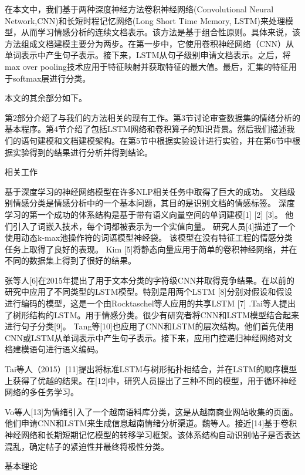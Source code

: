 \documentclass[a4paper,AutoFakeBold,oneside,12pt]{book}
\begin{document}
在本文中，我们基于两种深度神经方法卷积神经网络(Convolutional Neural Network,CNN)和长短时程记忆网络(Long Short Time Memory, LSTM)来处理模型，从而学习情感分析的连续文档表示。该方法是基于组合性原则。具体来说，该方法组成文档建模主要分为两步。在第一步中，它使用卷积神经网络（CNN）从单词表示中产生句子表示。接下来，LSTM从句子级别申请文档表示。之后，将max over pooling技术应用于特征映射并获取特征的最大值。最后，汇集的特征用于softmax层进行分类。

本文的其余部分如下。

第2部分介绍了与我们的方法相关的现有工作。第3节讨论审查数据集的情绪分析的基本程序。第4节介绍了包括LSTM网络和卷积算子的知识背景。然后我们描述我们的语句建模和文档建模架构。在第5节中根据实验设计进行实验，并在第6节中根据实验得到的结果进行分析并得到结论。

相关工作

基于深度学习的神经网络模型在许多NLP相关任务中取得了巨大的成功。 文档级别情感分类是情感分析中的一个基本问题，其目的是识别文档的情感标签。 深度学习的第一个成功的体系结构是基于带有语义向量空间的单词建模[1] [2] [3]。 他们引入了词嵌入技术，每个词都被表示为一个实值向量。 研究人员[4]描述了一个使用动态k-max池操作符的词语模型神经袋。 该模型在没有特征工程的情感分类任务上取得了良好的表现。 Kim [5]将静态向量应用于简单的卷积神经网络，并在不同的数据集上得到了很好的结果。

张等人[6]在2015年提出了用于文本分类的字符级CNN并取得竞争结果。在以前的研究中应用了不同类型的LSTM模型。特别是用两个LSTM [8]分别对假设和假设进行编码的模型，这是一个由Rocktaschel等人应用的共享LSTM [7] .Tai等人提出了树形结构的LSTM。用于情感分类。很少有研究者将CNN和LSTM模型结合起来进行句子分类[9]。 Tang等[10]也应用了CNN和LSTM的层次结构。他们首先使用CNN或LSTM从单词表示中产生句子表示。接下来，应用门控递归神经网络对文档建模语句进行语义编码。

Tai等人（2015）[11]提出将标准LSTM与树形拓扑相结合，并在LSTM的顺序模型上获得了优越的结果。在[12]中，研究人员提出了三种不同的模型，用于循环神经网络的多任务学习。

Vo等人[13]为情绪引入了一个越南语料库分类，这是从越南商业网站收集的页面。他们申请CNN和LSTM来生成信息越南情绪分析渠道。魏等人。接近[14]基于卷积神经网络和长期短期记忆模型的转移学习框架。该体系结构自动识别帖子是否表达混乱，确定帖子的紧迫性并最终将极性分类。

基本理论
\end{document}
